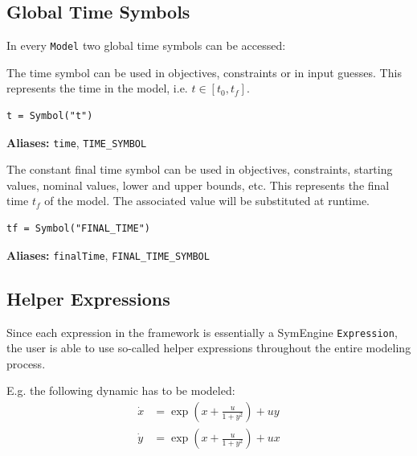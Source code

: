 \documentclass[12pt]{article}
\begin{document}
\subsection{Global Time Symbols}
\label{c:globaltime}
In every \texttt{Model} two global time symbols can be accessed:

\begin{mdframed}[backgroundcolor=gray!10, roundcorner=10pt,
		linewidth=1pt]

	The time symbol can be used in objectives, constraints or in
	input guesses. This represents the time in the model, i.e. $t \in [t_0,
			t_f]$.

	\begin{lstlisting}
t = Symbol("t")
		\end{lstlisting}
	\label{timeSymbol}

	\textbf{Aliases:} \texttt{time}, \texttt{TIME\_SYMBOL}
\end{mdframed}

\begin{mdframed}[backgroundcolor=gray!10, roundcorner=10pt,
		linewidth=1pt]

	The constant final time symbol can be used in objectives,
	constraints, starting values, nominal values, lower and upper bounds,
	etc.
	This represents the final time $t_f$ of the model. The
	associated value will be substituted at runtime.

	\begin{lstlisting}
tf = Symbol("FINAL_TIME")
		\end{lstlisting}
	\label{finalTimeSymbol}

	\textbf{Aliases:} \texttt{finalTime},
	\texttt{FINAL\_TIME\_SYMBOL}
\end{mdframed}

\subsection{Helper Expressions}

Since each expression in the framework is essentially a SymEngine
\texttt{Expression}, the user is able to use so-called helper expressions
throughout the entire modeling process.

E.g. the following dynamic has to be modeled:
\begin{align*}
	\dot{x} & = \exp\left(x + \frac{u}{1 + y^2}\right) + u y \\
	\dot{y} & = \exp\left(x + \frac{u}{1 + y^2}\right) + u x
\end{align*}
\end{document}
